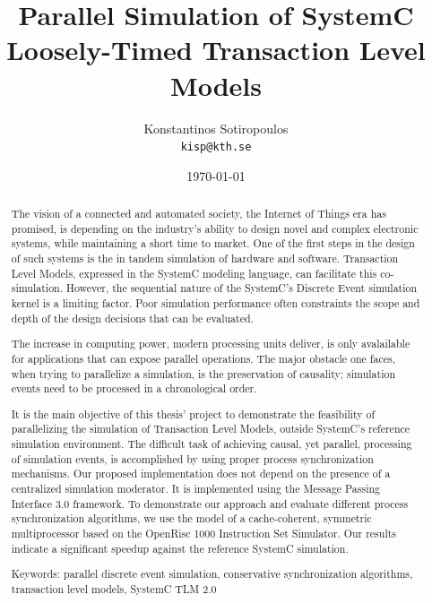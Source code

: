 \documentclass[12pt,twoside]{article}
\author{Konstantinos Sotiropoulos \\ \texttt{kisp@kth.se}}
\date{\today}
\title{Parallel Simulation of SystemC Loosely-Timed Transaction Level Models}
\begin{document}
\maketitle
\clearpage



\begin{abstract}
The vision of a connected and automated society, the Internet of Things era has promised,
is depending on the industry's ability to design novel and complex electronic systems,
while maintaining a short time to market.
One of the first steps in the design of such systems is the in tandem simulation of hardware and software.
Transaction Level Models, expressed in the SystemC modeling language, can facilitate this co-simulation.
However, the sequential nature of the SystemC's Discrete Event simulation kernel is a limiting factor.
Poor simulation performance often constraints the scope and depth of the design decisions that can be evaluated.

The increase in computing power, modern processing units deliver, is only avalailable for applications that can expose parallel operations.
The major obstacle one faces, when trying to parallelize a simulation, is the preservation of causality; simulation events need to be processed in a chronological order.

It is the main objective of this thesis' project to demonstrate the feasibility of parallelizing the simulation of Transaction Level Models, outside SystemC's reference simulation environment.
The difficult task of achieving causal, yet parallel, processing of simulation events, is accomplished by using proper process synchronization mechanisms.
Our proposed implementation does not depend on the presence of a centralized simulation moderator. 
It is implemented using the Message Passing Interface 3.0 framework.
To demonstrate our approach and evaluate different process synchronization algorithms,
we use the model of a cache-coherent, symmetric multiprocessor based on the OpenRisc 1000 Instruction Set Simulator. Our results indicate a significant speedup against the reference SystemC simulation.

Keywords: parallel discrete event simulation, conservative synchronization algorithms, transaction level models, SystemC TLM 2.0
\end{abstract}
\clearpage




\tableofcontents
\clearpage
\end{document}
